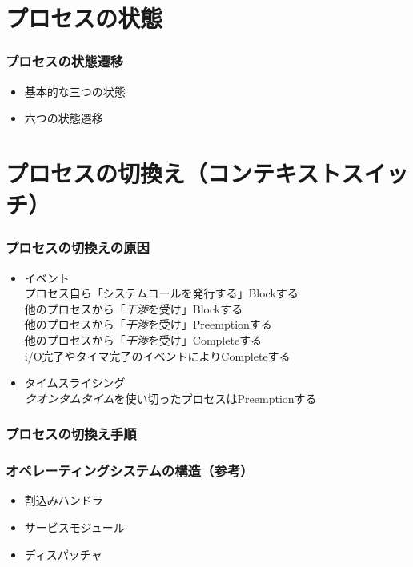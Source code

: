 \documentclass[unicode]{beamer}                   %
\begin{document}
\section{プロセスの状態}
\begin{frame}
  \frametitle{プロセスの状態遷移}
  \begin{itemize}
    \item 基本的な三つの状態
    \item 六つの状態遷移
  \end{itemize}
\end{frame}

\section{プロセスの切換え（コンテキストスイッチ）}
\begin{frame}
  \frametitle{プロセスの切換えの原因}
  \begin{itemize}
    \item イベント\\
      プロセス自ら「システムコールを発行する」Blockする \\
      他のプロセスから「\emph{干渉}を受け」Blockする    \\
      他のプロセスから「\emph{干渉}を受け」Preemptionする \\
      他のプロセスから「\emph{干渉}を受け」Completeする \\
      i/O完了やタイマ完了のイベントによりCompleteする
      \vfill
    \item タイムスライシング\\
      \emph{クオンタムタイム}を使い切ったプロセスはPreemptionする
  \end{itemize}
  \vfill
\end{frame}

\begin{frame}
  \frametitle{プロセスの切換え手順}
\end{frame}

\begin{frame}
  \frametitle{オペレーティングシステムの構造（参考）}
  \begin{itemize}
    \item 割込みハンドラ
    \item サービスモジュール
    \item ディスパッチャ
  \end{itemize}
\end{frame}
\end{document}
